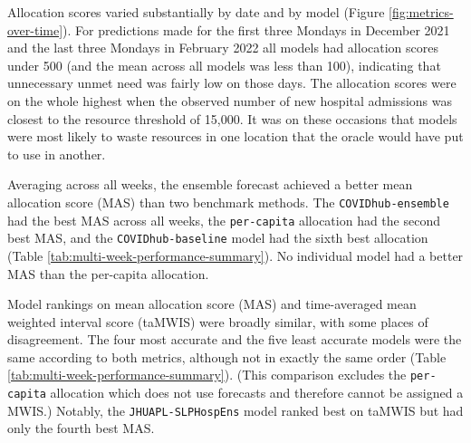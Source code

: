 \documentclass{article}\usepackage[]{graphicx}\usepackage[]{xcolor}
\begin{document}
Allocation scores varied substantially by date and by model (Figure \ref{fig:metrics-over-time}). For predictions made
for the first three Mondays in December 2021 and the last three Mondays in February 2022 all models had allocation
scores under 500 (and the mean across all models was less than 100), indicating that unnecessary unmet need was fairly
low on those days. The allocation scores were on the whole highest when the observed number of new hospital admissions
was closest to the resource threshold of 15,000.  It was on these occasions that models were most likely to waste resources
in one location that the oracle would have put to use in another.







Averaging across all weeks, the ensemble forecast achieved a better mean allocation score (MAS) than two benchmark
methods. The \texttt{COVIDhub-ensemble} had the best MAS across all weeks, the \texttt{per-capita} allocation had the
second best MAS, and the \texttt{COVIDhub-baseline} model had the sixth best allocation (Table
\ref{tab:multi-week-performance-summary}). No individual model had a better MAS than the per-capita allocation.

Model rankings on mean allocation score (MAS) and time-averaged mean weighted interval score (taMWIS) were broadly
similar, with some places of disagreement. The four most accurate and the five least accurate models were the same
according to both metrics, although not in exactly the same order (Table \ref{tab:multi-week-performance-summary}).
(This comparison excludes the \texttt{per-capita} allocation which does not use forecasts and therefore cannot be
assigned a MWIS.) Notably, the \texttt{JHUAPL-SLPHospEns} model ranked best on taMWIS but had only the fourth best MAS.
\end{document}
